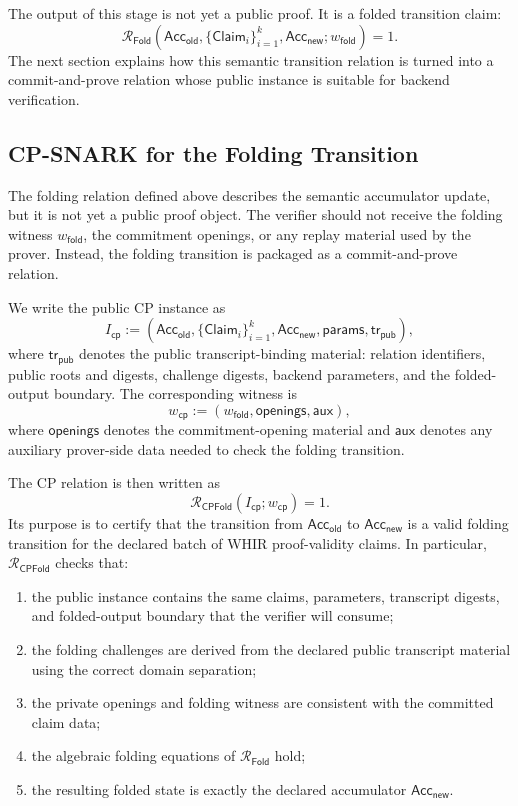 \documentclass[11pt]{article}
\theoremstyle{definition}
\newcommand{\Acc}{\mathsf{Acc}}
\newcommand{\Rfold}{\mathcal{R}_{\mathsf{Fold}}}
\newcommand{\Rcp}{\mathcal{R}_{\mathsf{CPFold}}}
\begin{document}
The output of this stage is not yet a public proof. It is a folded transition
claim:
\[
  \Rfold\!\left(
    \Acc_{\mathsf{old}},
    \{\mathsf{Claim}_i\}_{i=1}^k,
    \Acc_{\mathsf{new}};
    w_{\mathsf{fold}}
  \right)=1.
\]
The next section explains how this semantic transition relation is turned into
a commit-and-prove relation whose public instance is suitable for backend
verification.

\subsection{CP-SNARK for the Folding Transition}
\label{sec:cp-snark-for-folding-transition}

The folding relation defined above describes the semantic accumulator update,
but it is not yet a public proof object. The verifier should not receive the
folding witness $w_{\mathsf{fold}}$, the commitment openings, or any replay
material used by the prover. Instead, the folding transition is packaged as a
commit-and-prove relation.

We write the public CP instance as
\[
  I_{\mathsf{cp}}
  :=
  \left(
    \Acc_{\mathsf{old}},
    \{\mathsf{Claim}_i\}_{i=1}^k,
    \Acc_{\mathsf{new}},
    \mathsf{params},
    \mathsf{tr}_{\mathsf{pub}}
  \right),
\]
where $\mathsf{tr}_{\mathsf{pub}}$ denotes the public transcript-binding
material: relation identifiers, public roots and digests, challenge digests,
backend parameters, and the folded-output boundary. The corresponding witness
is
\[
  w_{\mathsf{cp}}
  :=
  \left(
    w_{\mathsf{fold}},
    \mathsf{openings},
    \mathsf{aux}
  \right),
\]
where $\mathsf{openings}$ denotes the commitment-opening material and
$\mathsf{aux}$ denotes any auxiliary prover-side data needed to check the
folding transition.

The CP relation is then written as
\[
  \Rcp(I_{\mathsf{cp}};w_{\mathsf{cp}})=1.
\]
Its purpose is to certify that the transition from $\Acc_{\mathsf{old}}$ to
$\Acc_{\mathsf{new}}$ is a valid folding transition for the declared batch of
WHIR proof-validity claims. In particular, $\Rcp$ checks that:
\begin{enumerate}
  \item the public instance contains the same claims, parameters, transcript
        digests, and folded-output boundary that the verifier will consume;
  \item the folding challenges are derived from the declared public transcript
        material using the correct domain separation;
  \item the private openings and folding witness are consistent with the
        committed claim data;
  \item the algebraic folding equations of $\Rfold$ hold;
  \item the resulting folded state is exactly the declared accumulator
        $\Acc_{\mathsf{new}}$.
\end{enumerate}
\end{document}
